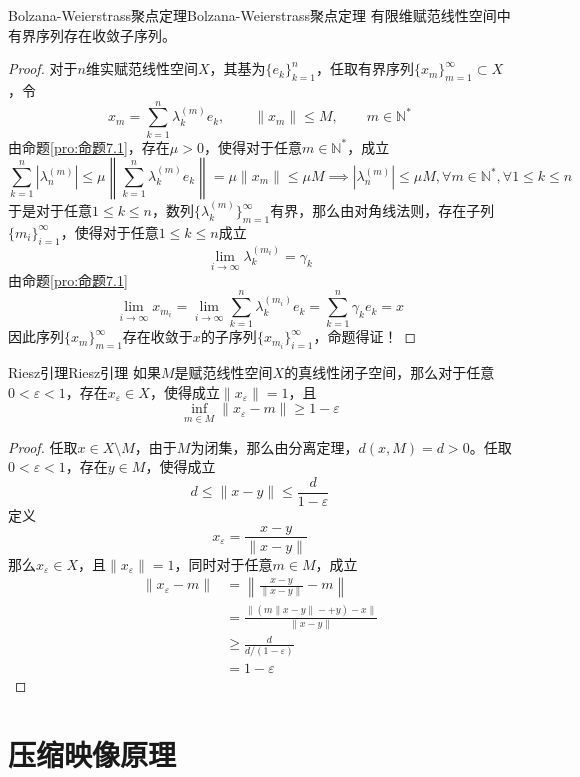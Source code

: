 \documentclass[lang = cn, scheme = chinese, thmcnt = section]{elegantbook}
\newcommand{\N}{\mathbb{N}}            %
\newcommand{\sub}{\subset}             %
\begin{document}
\begin{theorem}{Bolzana-Weierstrass聚点定理}{Bolzana-Weierstrass聚点定理}
	有限维赋范线性空间中有界序列存在收敛子序列。
\end{theorem}

\begin{proof}
	对于$n$维实赋范线性空间$X$，其基为$\{e_k\}_{k=1}^{n}$，任取有界序列$\{ x_m \}_{m=1}^{\infty}\sub X$，令
	$$
	x_m=\sum_{k=1}^{n}\lambda_k^{(m)}e_k,\qquad 
	\|x_m\|\le M,\qquad
	m\in\N^*
	$$
	由命题\ref{pro:命题7.1}，存在$\mu>0$，使得对于任意$m\in\N^*$，成立
	$$
	\sum_{k=1}^{n}|\lambda_n^{(m)}|
	\le\mu\left\| \sum_{k=1}^{n}\lambda_k^{(m)} e_k \right\|
	= \mu\|x_m\|\le\mu M
	\implies |\lambda_n^{(m)}|\le \mu M,\forall m\in\N^*,\forall 1\le k\le n
	$$
	于是对于任意$1\le k\le n$，数列$\{\lambda_k^{(m)}\}_{m=1}^{\infty}$有界，那么由对角线法则，存在子列$\{ m_i \}_{i=1}^{\infty}$，使得对于任意$1\le k\le n$成立
	$$
	\lim_{i\to\infty}\lambda_k^{(m_i)}=\gamma_k
	$$
	由命题\ref{pro:命题7.1}
	$$
	\lim_{i\to\infty} x_{m_i}
	=\lim_{i\to\infty}\sum_{k=1}^{n}\lambda_k^{(m_i)}e_k
	= \sum_{k=1}^{n}\gamma_ke_k=x
	$$
	因此序列$\{ x_m \}_{m=1}^{\infty}$存在收敛于$x$的子序列$\{ x_{m_i} \}_{i=1}^{\infty}$，命题得证！
\end{proof}

\begin{theorem}{Riesz引理}{Riesz引理}
	如果$M$是赋范线性空间$X$的真线性闭子空间，那么对于任意$0<\varepsilon<1$，存在$x_\varepsilon\in X$，使得成立$\|x_\varepsilon\|=1$，且
	$$
	\inf_{m\in M}\|x_\varepsilon-m\|\ge 1-\varepsilon
	$$
\end{theorem}

\begin{proof}
	任取$x\in X\setminus M$，由于$M$为闭集，那么由分离定理，$d(x,M)=d>0$。任取$0<\varepsilon<1$，存在$y\in M$，使得成立
	$$
	d\le \|x-y\|\le \frac{d}{1-\varepsilon}
	$$
	定义
	$$
	x_\varepsilon=\frac{x-y}{\|x-y\|}
	$$
	那么$x_\varepsilon\in X$，且$\|x_\varepsilon\|=1$，同时对于任意$m\in M$，成立
	\begin{align*}
		\|x_\varepsilon-m\|
		& = \left\| \frac{x-y}{\|x-y\|}-m \right\|\\
		& = \frac{\|(m\|x-y\|-+y)-x\|}{\|x-y\|}\\
		& \ge \frac{d}{d/(1-\varepsilon)}\\
		& = 1-\varepsilon
	\end{align*}
\end{proof}

\section{压缩映像原理}
\end{document}
